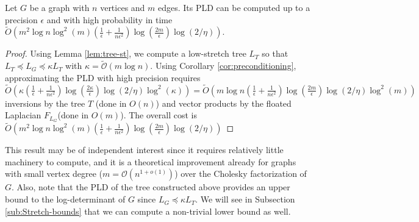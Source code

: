 \begin{theorem} \label{thm:PLD-tree}Let $G$ be a graph with $n$
vertices and $m$ edges. Its PLD can be computed up to a precision
$\epsilon$ and with high probability in time $\tilde{O}\left(m^{2}\log n\log^{2}\left(m\right)\left(\frac{1}{\epsilon}+\frac{1}{n\epsilon^{2}}\right)\log\left(\frac{2m}{\epsilon}\right)\log\left(2/\eta\right)\right)$.\end{theorem}

\begin{proof} Using Lemma \eqref{lem:tree-st}, we compute a low-stretch
tree $L_{T}$ so that $L_{T}\preceq L_{G}\preceq\kappa L_{T}$ with
$\kappa=\tilde{\mathcal{O}}\left(m\log n\right)$. Using Corollary
\eqref{cor:preconditioning}, approximating the PLD with high precision
requires $\tilde{O}\left(\kappa\left(\frac{1}{\epsilon}+\frac{1}{n\epsilon^{2}}\right)\log\left(\frac{2\kappa}{\epsilon}\right)\log\left(2/\eta\right)\log^{2}\left(\kappa\right)\right)=\tilde{O}\left(m\log n\left(\frac{1}{\epsilon}+\frac{1}{n\epsilon^{2}}\right)\log\left(\frac{2m}{\epsilon}\right)\log\left(2/\eta\right)\log^{2}\left(m\right)\right)$
inversions by the tree $T$ (done in $O\left(n\right)$) and vector
products by the floated Laplacian $F_{L_{G}}$(done in $O\left(m\right)$).
The overall cost is $\tilde{O}\left(m^{2}\log n\log^{2}\left(m\right)\left(\frac{1}{\epsilon}+\frac{1}{n\epsilon^{2}}\right)\log\left(\frac{2m}{\epsilon}\right)\log\left(2/\eta\right)\right)$
\end{proof}

This result may be of independent interest since it requires relatively
little machinery to compute, and it is a theoretical improvement already
for graphs with small vertex degree ($m=\mathcal{O}\left(n^{1+o\left(1\right)}\right)$)
over the Cholesky factorization of $G$. Also, note that the PLD of
the tree constructed above provides an upper bound to the log-determinant
of $G$ since $L_{G}\preceq\kappa L_{T}$. We will see in Subsection
\ref{sub:Stretch-bounds} that we can compute a non-trivial lower
bound as well. 
